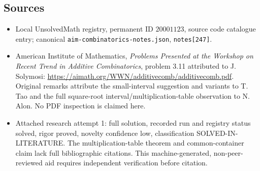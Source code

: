 \documentclass[11pt]{article}
\begin{document}
\subsection{Sources}
\begin{itemize}
\item Local UnsolvedMath registry, permanent ID $20001123$, source code catalogue entry; canonical \texttt{aim-combinatorics-notes.json}, \texttt{notes[247]}.
\item American Institute of Mathematics, \emph{Problems Presented at the Workshop on Recent Trend in Additive Combinatorics}, problem 3.11 attributed to J. Solymosi: \url{https://aimath.org/WWN/additivecomb/additivecomb.pdf}. Original remarks attribute the small-interval suggestion and variants to T. Tao and the full square-root interval/multiplication-table observation to N. Alon. No PDF inspection is claimed here.
\item Attached research attempt 1: full solution, recorded run and registry status solved, rigor proved, novelty confidence low, classification SOLVED-IN-LITERATURE. The multiplication-table theorem and common-container claim lack full bibliographic citations. This machine-generated, non-peer-reviewed aid requires independent verification before citation.
\end{itemize}
\end{document}
